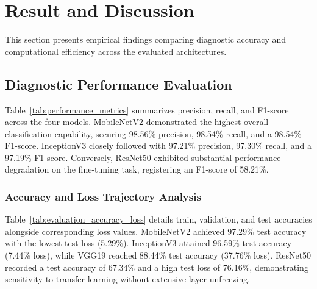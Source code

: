 \documentclass{ijcaArticle}
\begin{document}
\section{Result and Discussion}
\label{sec:result_and_discussion}

This section presents empirical findings comparing diagnostic accuracy and computational efficiency across the evaluated architectures.

\subsection{Diagnostic Performance Evaluation}

Table~\ref{tab:performance_metrics} summarizes precision, recall, and F1-score across the four models. MobileNetV2 demonstrated the highest overall classification capability, securing 98.56\% precision, 98.54\% recall, and a 98.54\% F1-score. InceptionV3 closely followed with 97.21\% precision, 97.30\% recall, and a 97.19\% F1-score. Conversely, ResNet50 exhibited substantial performance degradation on the fine-tuning task, registering an F1-score of 58.21\%.

\begin{table}[htbp]
\label{tab:performance_metrics}
\end{table}

\subsubsection{Accuracy and Loss Trajectory Analysis}
Table~\ref{tab:evaluation_accuracy_loss} details train, validation, and test accuracies alongside corresponding loss values. MobileNetV2 achieved 97.29\% test accuracy with the lowest test loss (5.29\%). InceptionV3 attained 96.59\% test accuracy (7.44\% loss), while VGG19 reached 88.44\% test accuracy (37.76\% loss). ResNet50 recorded a test accuracy of 67.34\% and a high test loss of 76.16\%, demonstrating sensitivity to transfer learning without extensive layer unfreezing.
\end{document}
